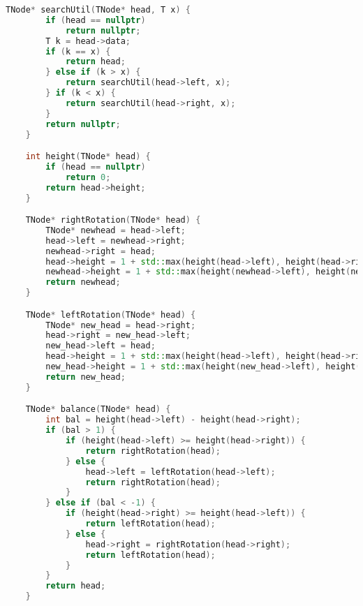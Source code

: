 \documentclass[12pt]{article}
\begin{document}
\begin{lstlisting}[language=C++]
    TNode* searchUtil(TNode* head, T x) {
        if (head == nullptr)
            return nullptr;
        T k = head->data;
        if (k == x) {
            return head;
        } else if (k > x) {
            return searchUtil(head->left, x);
        } if (k < x) {
            return searchUtil(head->right, x);
        }
        return nullptr;
    }

    int height(TNode* head) {
        if (head == nullptr)
            return 0;
        return head->height;
    }

    TNode* rightRotation(TNode* head) {
        TNode* newhead = head->left;
        head->left = newhead->right;
        newhead->right = head;
        head->height = 1 + std::max(height(head->left), height(head->right));
        newhead->height = 1 + std::max(height(newhead->left), height(newhead->right));
        return newhead;
    }

    TNode* leftRotation(TNode* head) {
        TNode* new_head = head->right;
        head->right = new_head->left;
        new_head->left = head;
        head->height = 1 + std::max(height(head->left), height(head->right));
        new_head->height = 1 + std::max(height(new_head->left), height(new_head->right));
        return new_head;
    }

    TNode* balance(TNode* head) {
        int bal = height(head->left) - height(head->right);
        if (bal > 1) {
            if (height(head->left) >= height(head->right)) {
                return rightRotation(head);
            } else {
                head->left = leftRotation(head->left);
                return rightRotation(head);
            }
        } else if (bal < -1) {
            if (height(head->right) >= height(head->left)) {
                return leftRotation(head);
            } else {
                head->right = rightRotation(head->right);
                return leftRotation(head);
            }
        }
        return head;
    }


\end{lstlisting}
\end{document}
